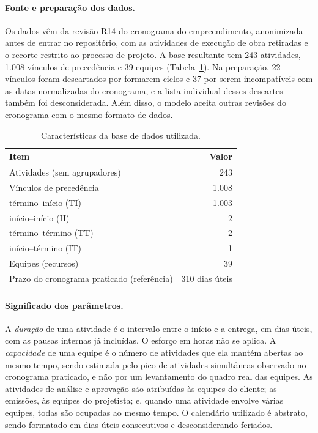 \paragraph{Fonte e preparação dos dados.}
Os dados vêm da revisão R14 do cronograma do empreendimento, anonimizada
antes de entrar no repositório, com as atividades de execução de obra
retiradas e o recorte restrito ao processo de projeto. A base
resultante tem 243 atividades, 1.008 vínculos de precedência e 39 equipes
(Tabela~\ref{tab:base}). Na preparação, 22 vínculos foram descartados por
formarem ciclos e 37 por serem incompatíveis com as datas normalizadas do
cronograma, e a lista individual desses descartes também foi desconsiderada. Além disso, o
modelo aceita outras revisões do cronograma com o mesmo formato de dados.

\begin{table}[htbp]
  \centering
  \caption{Características da base de dados utilizada.}
  \label{tab:base}
  \small
  \begin{tabular}{lr}
    \toprule
    Item & Valor \\
    \midrule
    Atividades (sem agrupadores) & 243 \\
    Vínculos de precedência & 1.008 \\
    \quad término--início (TI) & 1.003 \\
    \quad início--início (II) & 2 \\
    \quad término--término (TT) & 2 \\
    \quad início--término (IT) & 1 \\
    Equipes (recursos) & 39 \\
    Prazo do cronograma praticado (referência) & 310 dias úteis \\
    \bottomrule
  \end{tabular}
\end{table}

\paragraph{Significado dos parâmetros.}
A \emph{duração} de uma atividade é o intervalo entre o início e a
entrega, em dias úteis, com as pausas internas já incluídas. O esforço em horas não se aplica. A \emph{capacidade} de uma equipe é o número de
atividades que ela mantém abertas ao mesmo tempo, sendo estimada pelo
pico de atividades simultâneas observado no cronograma praticado, e não por
um levantamento do quadro real das equipes. As atividades de análise e
aprovação são atribuídas às equipes do cliente; as emissões, às equipes do
projetista; e, quando uma atividade envolve várias equipes, todas são
ocupadas ao mesmo tempo. O calendário utilizado é abstrato, sendo formatado em dias úteis
consecutivos e desconsiderando feriados.


